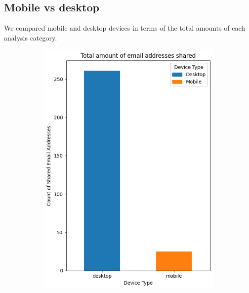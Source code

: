 \subsection{Mobile vs desktop}
We compared mobile and desktop devices in terms of the total amounts of each analysis category.
\begin{figure}[h!]
    \centering
    
    \begin{subfigure}[b]{0.28\textwidth}
        \includegraphics[width=\textwidth]{./assets/comparison4.png}
        \caption{}
        \label{fig:3rdparty}
    \end{subfigure}
    \hfill
    \begin{subfigure}[b]{0.28\textwidth}

\end{subfigure}
\end{figure}
